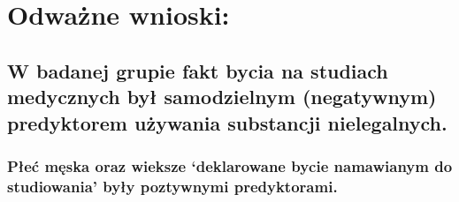 \documentclass[]{article}
\begin{document}
\section{Odważne wnioski:}\label{odwazne-wnioski}

\subsection{\texorpdfstring{\textbf{W badanej grupie fakt bycia na
studiach medycznych był samodzielnym (negatywnym) predyktorem używania
substancji
nielegalnych.}}{W badanej grupie fakt bycia na studiach medycznych był samodzielnym (negatywnym) predyktorem używania substancji nielegalnych.}}\label{w-badanej-grupie-fakt-bycia-na-studiach-medycznych-by-samodzielnym-negatywnym-predyktorem-uzywania-substancji-nielegalnych.}

\subsubsection{\texorpdfstring{Płeć męska oraz wieksze `deklarowane
bycie namawianym do studiowania' były poztywnymi
predyktorami.}{Płeć męska oraz wieksze deklarowane bycie namawianym do studiowania były poztywnymi predyktorami.}}\label{pec-meska-oraz-wieksze-deklarowane-bycie-namawianym-do-studiowania-byy-poztywnymi-predyktorami.}
\end{document}
